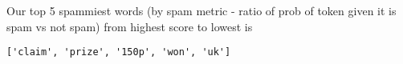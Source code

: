 \begin{answer}
Our top 5 spammiest words (by spam metric - ratio of prob of token given it is spam vs not spam) from highest score to lowest is \begin{verbatim}['claim', 'prize', '150p', 'won', 'uk']\end{verbatim}
\end{answer}
